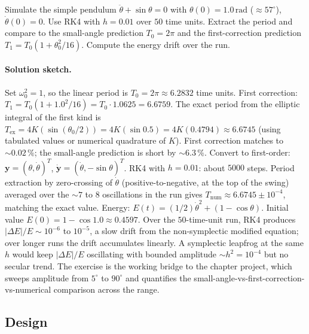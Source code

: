 \begin{exercise}
Simulate the simple pendulum $\ddot\theta + \sin\theta = 0$ with
$\theta(0) = 1.0\,\si{\radian}$ ($\approx 57^{\circ}$),
$\dot\theta(0) = 0$. Use RK4 with $h = 0.01$ over $50$ time
units. Extract the period and compare to the small-angle
prediction $T_{0} = 2\pi$ and the first-correction prediction
$T_{1} = T_{0}(1 + \theta_{0}^{2}/16)$. Compute the energy drift
over the run.

\paragraph{Solution sketch.} Set $\omega_{0}^{2} = 1$, so the
linear period is $T_{0} = 2 \pi \approx 6.2832$ time units.
First correction: $T_{1} = T_{0}(1 + 1.0^{2}/16) = T_{0} \cdot
1.0625 = 6.6759$. The exact period from the elliptic integral
of the first kind is $T_{\text{ex}} = 4 K(\sin(\theta_{0}/2)) =
4 K(\sin 0.5) = 4 K(0.4794) \approx 6.6745$ (using tabulated
values or numerical quadrature of $K$). First correction matches
to $\sim 0.02\,\%$; the small-angle prediction is short by
$\sim 6.3\,\%$. Convert to first-order: $\mathbf{y} = (\theta,
\dot\theta)^{T}$, $\dot{\mathbf{y}} = (\dot\theta, -\sin\theta)^{T}$.
RK4 with $h = 0.01$: about $5000$ steps. Period extraction by
zero-crossing of $\dot\theta$ (positive-to-negative, at the top
of the swing) averaged over the $\sim 7$ to $8$ oscillations in
the run gives $T_{\text{num}} \approx 6.6745 \pm 10^{-4}$,
matching the exact value. Energy: $E(t) = (1/2) \dot\theta^{2}
+ (1 - \cos\theta)$. Initial value $E(0) = 1 - \cos 1.0 \approx
0.4597$. Over the $50$-time-unit run, RK4 produces $|\Delta E|/E
\sim 10^{-6}$ to $10^{-5}$, a slow drift from the
non-symplectic modified equation; over longer runs the drift
accumulates linearly. A symplectic leapfrog at the same $h$
would keep $|\Delta E|/E$ oscillating with bounded amplitude $\sim
h^{2} = 10^{-4}$ but no secular trend. The exercise is the
working bridge to the chapter project, which sweeps amplitude
from $5^{\circ}$ to $90^{\circ}$ and quantifies the
small-angle-vs-first-correction-vs-numerical comparison across
the range.
\end{exercise}

\subsection*{Design}

